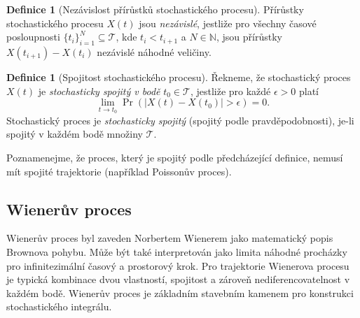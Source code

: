 \documentclass[a4paper,12pt]{report}
\theoremstyle{definition} \newtheorem{definice}[veta]{Definice}
\theoremstyle{remark}
\begin{document}
\begin{definice}[Nezávislost přírůstků stochastického procesu]
Přírůstky stochastického procesu $X(t)$ jsou \textit{nezávislé}, jestliže pro všechny časové posloupnosti $\{t_i\}_{i=1}^N\subseteq\mathcal{T}$, kde $t_i<t_{i+1}$ a $N\in\mathbb{N}$, jsou přírůstky $X(t_{i+1})-X(t_i)$ nezávislé náhodné veličiny.
\end{definice}

\begin{definice}[Spojitost stochastického procesu]
Řekneme, že stochastický proces $X(t)$ je \textit{stochasticky spojitý v bodě} $t_0\in\mathcal{T}$, jestliže pro každé $\epsilon>0$ platí
$$\lim_{t\to t_0}\Pr(|X(t)-X(t_0)|>\epsilon)=0.$$
Stochastický proces je  \textit{stochasticky spojitý} (spojitý podle pravděpodobnosti), je-li spojitý v každém bodě množiny $\mathcal{T}$.
\end{definice}
Poznamenejme, že proces, který je spojitý podle předcházející definice, nemusí mít spojité trajektorie (například Poissonův proces).


\subsection{Wienerův proces}\label{WP_kap}
Wienerův proces byl zaveden Norbertem Wienerem jako matematický popis Brownova pohybu.
Může být také interpretován jako limita náhodné procházky pro infinitezimální časový a prostorový krok.
Pro trajektorie Wienerova procesu je typická kombinace dvou vlastností, spojitost a zároveň nediferencovatelnost v každém bodě.
Wienerův proces je základním stavebním kamenem pro konstrukci stochastického integrálu.
\end{document}
